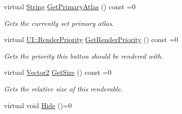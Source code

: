 \begin{DoxyCompactItemize}
virtual \hyperlink{namespaceMezzanine_acf9fcc130e6ebf08e3d8491aebcf1c86}{String} \hyperlink{classMezzanine_1_1UI_1_1BasicRenderable_abdb08ae3577da75762209b8cee486b24}{GetPrimaryAtlas} () const =0
\begin{DoxyCompactList}\small\item\em Gets the currently set primary atlas. \item\end{DoxyCompactList}\item 
virtual \hyperlink{namespaceMezzanine_1_1UI_ac4c753eb6b5d66350a243acc9ce54130}{UI::RenderPriority} \hyperlink{classMezzanine_1_1UI_1_1BasicRenderable_a3279ed466dfc69203467b2bb32cf89be}{GetRenderPriority} () const =0
\begin{DoxyCompactList}\small\item\em Gets the priority this button should be rendered with. \item\end{DoxyCompactList}\item 
virtual \hyperlink{classMezzanine_1_1Vector2}{Vector2} \hyperlink{classMezzanine_1_1UI_1_1BasicRenderable_a6486ceae69273b990bfe19b88c29d328}{GetSize} () const =0
\begin{DoxyCompactList}\small\item\em Gets the relative size of this renderable. \item\end{DoxyCompactList}\item 
\hypertarget{classMezzanine_1_1UI_1_1BasicRenderable_a2728dec624ab5e1b9ce738b180b56e87}{
virtual void \hyperlink{classMezzanine_1_1UI_1_1BasicRenderable_a2728dec624ab5e1b9ce738b180b56e87}{Hide} ()=0}
\label{classMezzanine_1_1UI_1_1BasicRenderable_a2728dec624ab5e1b9ce738b180b56e87}


\end{DoxyCompactItemize}
